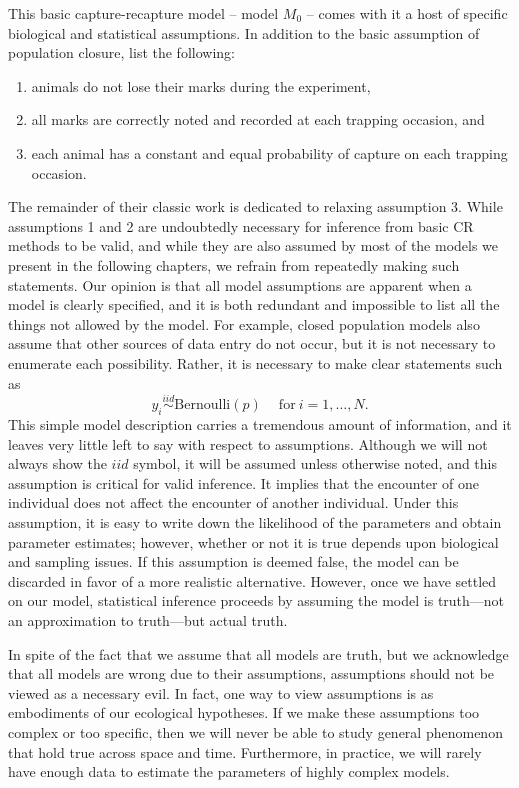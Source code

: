 This  basic capture-recapture model -- model $M_{0}$ -- comes with it
a host of specific biological and statistical assumptions.
In addition to the basic assumption of population closure,
\citet{otis_etal:1978} list the following:
\begin{enumerate}
  \item animals do not lose their marks during the experiment,
  \item all marks are correctly noted and recorded at each trapping
    occasion, and
  \item each animal has a constant and equal probability of capture on
    each trapping occasion.
\end{enumerate}
The remainder of their classic work is dedicated to relaxing
assumption 3. While assumptions 1 and 2 are undoubtedly necessary for
inference from basic CR methods to be valid, and while they are
also assumed by most of the models we present in the following
chapters, we refrain from repeatedly making such statements. Our
opinion is that all model assumptions are apparent when a model is
clearly specified, and it is both redundant and impossible to list all
the things not allowed by the model. For example, closed population
models also assume that other sources of data entry do not occur, but
it is not necessary to enumerate each possibility. Rather, it is
necessary to make clear statements such as
\[
y_i \stackrel{iid}{\sim} \text{Bernoulli}(p) \quad \: \text{for}\: i=1,\ldots,N.
\]
This simple model description carries a tremendous amount of
information, and it leaves very little left to say with respect to
assumptions. Although we will not always show the $iid$ symbol, it
will be assumed unless otherwise noted, and this assumption is
critical for valid inference. It implies that the encounter of one
individual does not affect the encounter of another
individual. Under this assumption, it is  easy to write down the
likelihood of the parameters and obtain parameter estimates; however,
whether or not it is true depends upon biological and sampling
issues. If this assumption is deemed false, the model can be discarded
in favor of a more realistic alternative. However, once we have
settled on our model, statistical inference proceeds by assuming the
model is truth---not an approximation to truth---but actual
truth.

In spite of the fact that we assume that all models are truth, but we
acknowledge that all models are wrong due to their assumptions,
assumptions should not be viewed as a necessary evil. In fact, one way
to view assumptions is as embodiments of our ecological hypotheses. If
we make these assumptions too complex or too specific, then we will
never be able to study general phenomenon that hold true across space
and time. Furthermore, in practice, we will rarely have enough data to estimate the
parameters of highly complex models.



